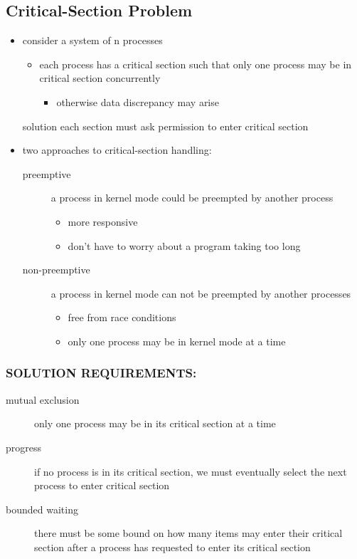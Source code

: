 \documentclass[11pt]{article}
\begin{document}
\subsection{Critical-Section Problem}
\label{sec:orgce86dde}
\begin{itemize}
\item consider a system of n processes
\begin{itemize}
\item each process has a critical section such that only one process may be in critical section concurrently
\begin{itemize}
\item otherwise data discrepancy may arise
\end{itemize}
\end{itemize}
\item[{solution}] each section must ask permission to enter critical section
\item two approaches to critical-section handling:
\begin{description}
\item[{preemptive}] a process in kernel mode could be preempted by another process
\begin{itemize}
\item more responsive
\item don't have to worry about a program taking too long
\end{itemize}
\item[{non-preemptive}] a process in kernel mode can not be preempted by another processes
\begin{itemize}
\item free from race conditions
\item only one process may be in kernel mode at a time
\end{itemize}
\end{description}
\end{itemize}
\subsubsection{SOLUTION REQUIREMENTS:}
\label{sec:orgdcef8cb}
\begin{description}
\item[{mutual exclusion}] only one process may be in its critical section at a time
\item[{progress}] if no process is in its critical section, we must eventually select the next process to enter critical section
\item[{bounded waiting}] there must be some bound on how many items may enter their critical section after a process has requested to enter its critical section
\end{description}
\end{document}
